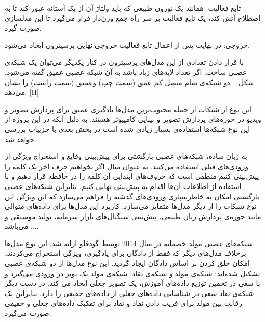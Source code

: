  تابع فعالیت: همانند یک نورون طبیعی که باید ولتاژ آن از یک آستانه عبور کند تا به اصطلاح آتش کند، یک تابع فعالیت بر سر راه جمع وزن‌دار قرار می‌گیرد تا این مدلسازی صورت گیرد.

 خروجی: در نهایت پس از اعمال تابع فعالیت خروجی نهایی پرسپترون ایجاد می‌شود.

با قرار دادن تعدادی از این مدل‌های پرسپترون در کنار یکدیگر می‌توان یک شبکه‌ی عصبی ساخت. اگر تعداد لایه‌های زیاد باشد به آن شبکه عصبی عمیق گفته می‌شود. شکل ~ دو شبکه‌ی تمام متصل کم عمق (سمت چپ) وعمیق (سمت راست) را نشان می‌دهد. 
[H]

این نوع از شبکات از جمله محبوب‌ترین مدل‌ها یادگیری عمیق برای پردازش تصویر و ویدیو در حوزه‌های پردازش تصویر و بینایی کامپیوتر هستند. به دلیل آنکه در این پروژه از این نوع شبکه‌ها استفاده‌ی بسیار زیادی شده است در بخش بعدی با جزییات بررسی خواهد شد.

به زبان ساده، شبکه‌های عصبی بازگشتی برای پیش‌بینی وقایع و استخراج ویژگی از ورودی‌های قبلی استفاده می‌کنند. به عنوان مثال اگر بخواهیم حرف اخر یک کلمه را پیش‌بینی کنیم منطقی است که حروف‌های ابتدایی آن کلمه را در حافظه قرار دهیم و با استفاده از اطلاعات آن‌ها اقدام به پیش‌بینی نهایی کنیم. بنابراین شبکه‌های عصبی بازگشتی امکان به ‌خاطرسپاری ورودی‌های گذشته را فراهم می‌سازد که این ویژگی این نوع شبکات را از دیگر مدل‌ها متمایز می‌سازد. کاربرد این مدل‌ها برای داده‌های متوالی مانند حوزه‌ی پردازش زبان طبیعی، پیش‌بینی سیگنال‌های بازار سرمایه، تولید موسیقی و ... می‌باشد.

شبکه‌های عصبی مولد خصمانه در سال 2014 توسط گودفلو  ارایه شد. این نوع مدل‌ها برخلاف مدل‌های دیگر که فقط از دادگان برای یادگیری، ویژگی استخراج می‌کردند، امکان خلق کردن بر اساس دادگان ایجاد گردید. این نوع مدل‌ها از دو شبکه‌ی عصبی تشکیل شده‌اند: شبکه‌ی مولد و شبکه‌ی نقاد. شبکه‌ی مولد یک نویز در ورودی می‌گیرد و با سعی در تخمین توزیع داده‌های آموزش، یک تصویر جعلی ایجاد می کند. در دست دیگر شبکه‌ی نقاد سعی در شناسایی داده‌های جعلی از داده‌های حقیقی را دارد. بنابراین یک رقابت بین مولد برای فریب دادن نقاد و نقاد برای تفکیک داده‌های جعلی و حقیقی صورت می‌گیرد. 

